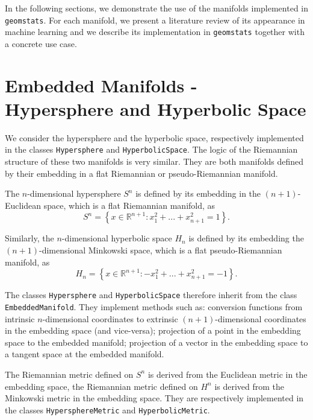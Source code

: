 \documentclass{article}
\begin{document}

In the following sections, we demonstrate the use of the manifolds implemented in \texttt{geomstats}. For each manifold, we present a literature review of its appearance in machine learning and we describe its implementation in \texttt{geomstats} together with a concrete use case.

\section{Embedded Manifolds - Hypersphere and Hyperbolic Space}\label{sec:hypersphere}

We consider the hypersphere and the hyperbolic space, respectively implemented in the classes \texttt{Hypersphere} and \texttt{HyperbolicSpace}. The logic of the Riemannian structure of these two manifolds is very similar. They are both manifolds defined by their embedding in a flat Riemannian or pseudo-Riemannian manifold. 

The $n$-dimensional hypersphere $S^{n}$ is defined by its embedding in the $(n+1)$-Euclidean space, which is a flat Riemannian manifold, as
\begin{equation}
S^{n} = \left\{
x \in \mathbb{R}^{n+1}: x_1^2 + ... + x_{n+1}^2 = 1 
\right\}.
\end{equation}

Similarly, the $n$-dimensional hyperbolic space $H_n$ is defined by its embedding the $(n+1)$-dimensional Minkowski space, which is a flat pseudo-Riemannian manifold, as
\begin{equation}
H_{n} = \left\{
x \in \mathbb{R}^{n+1}: - x_1^2 + ... + x_{n+1}^2 = -1 
\right\}.
\end{equation}

The classes \texttt{Hypersphere} and \texttt{HyperbolicSpace} therefore inherit from the class \texttt{EmbeddedManifold}. They implement methods such as: conversion functions from intrinsic $n$-dimensional coordinates to extrinsic $(n+1)$-dimensional coordinates in the embedding space (and vice-versa); projection of a point in the embedding space to the embedded manifold; projection of a vector in the embedding space to a tangent space at the embedded manifold. 

The Riemannian metric defined on $S^n$ is derived from the Euclidean metric in the embedding space, the Riemannian metric defined on $H^n$ is derived from the Minkowski metric in the embedding space. They are respectively implemented in the classes \texttt{HypersphereMetric} and \texttt{HyperbolicMetric}.
\end{document}

